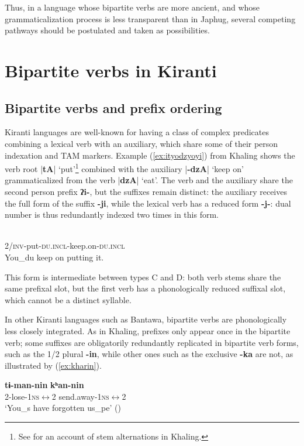 \documentclass[oneside,a4paper,11pt]{article}
\newcommand{\ipa}[1]{{\phon\textbf{#1}}}
\newcommand{\dhatu}[2]{|\ipa{#1}| `#2'}
\newcommand{\refb}[1]{(\ref{#1})}
\begin{document}
Thus, in a language whose bipartite verbs are more ancient, and whose grammaticalization process is less transparent than in Japhug, several competing pathways should be postulated and taken as possibilities.

\section{Bipartite verbs in Kiranti} \label{sec:kiranti.bipart}

\subsection{Bipartite verbs and prefix ordering}
Kiranti languages are well-known for having a class of complex predicates combining a lexical verb with an auxiliary, which share some of their person indexation and TAM markers. Example (\ref{ex:ityodzyoyi}) from Khaling shows the verb root \dhatu{tA}{put}\footnote{See \citet{jacques12khaling} for an account of stem alternations in Khaling.} combined with the auxiliary \dhatu{-dzA}{keep on} grammaticalized from the verb \dhatu{dzA}{eat}. The verb and the auxiliary share the second person prefix \ipa{ʔi-}, but the suffixes remain distinct: the auxiliary receives the full form of the suffix \ipa{-ji}, while the lexical verb has a reduced form \ipa{-j-}: dual number is thus redundantly indexed two times in this form.

\begin{exe}
\ex \label{ex:ityodzyoyi}
\gll \ipa{ʔi-tɵ-j-dzɵ-ji}\\
2/\textsc{inv}-put-\textsc{du.incl}-keep.on-\textsc{du.incl} \\
\glt You_{du} keep on putting it.
\end{exe}

This form is intermediate between types C and D: both verb stems share the same prefixal slot, but the first verb has a phonologically reduced suffixal slot, which cannot be a distinct syllable.

In other Kiranti languages such as Bantawa, bipartite verbs are phonologically less closely integrated. As in Khaling, prefixes only appear once in the bipartite verb; some suffixes are obligatorily redundantly replicated in bipartite verb forms, such as the 1/2 plural \ipa{-in}, while other ones such as the exclusive \ipa{-ka} are not, as illustrated by \refb{ex:kharin}. 

\begin{exe}
\ex \label{ex:timannin}
\gll
\ipa{tɨ-man-nin} \ipa{kʰan-nin} \\
2-lose-\textsc{1ns$\leftrightarrow$2} send.away-\textsc{1ns$\leftrightarrow$2} \\
\glt ‘You_s have forgotten us_{pe}’ (\citealt[168]{doornenbal09})
\end{exe}
\end{document}
